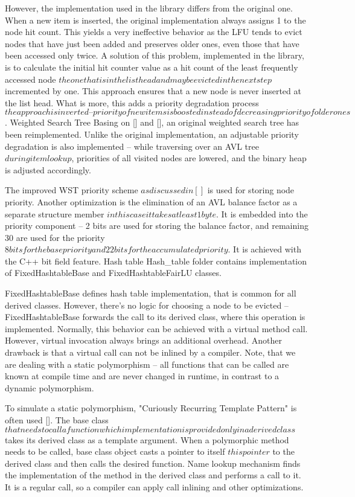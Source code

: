 However, the implementation used in the library differs from the original one. When a new item is inserted, the original implementation always assigns 1 to the node hit count. This yields a very ineffective behavior as the LFU tends to evict nodes that have just been added and preserves older ones, even those that have been accessed only twice. A solution of this problem, implemented in the library, is to calculate the initial hit counter value as a hit count of the least frequently accessed node \(the one that is in the list head and may be evicted in the next step\) incremented by one. This approach ensures that a new node is never inserted at the list head. What is more, this adds a priority degradation process \(the approach is inverted – priority of new items is boosted instead of decreasing priority of older ones\).
Weighted Search Tree
Basing on [] and [], an original weighted search tree has been reimplemented. Unlike the original implementation, an adjustable priority degradation is also implemented – while traversing over an AVL tree \(during item lookup\), priorities of all visited nodes are lowered, and the binary heap is adjusted accordingly.

The improved WST priority scheme \(as discussed in []\) is used for storing node priority. Another optimization is the elimination of an AVL balance factor as a separate structure member \(in this case it takes at least 1 byte\). It is embedded into the priority component – 2 bits are used for storing the balance factor, and remaining 30 are used for the priority \(8 bits for the base priority and 22 bits for the accumulated priority\). It is achieved with the C++ bit field feature.
Hash table
Hash\_table folder contains implementation of FixedHashtableBase and FixedHashtableFairLU classes.

FixedHashtableBase defines hash table implementation, that is common for all derived classes. However, there’s no logic for choosing a node to be evicted – FixedHashtableBase forwards the call to its derived class, where this operation is implemented. Normally, this behavior can be achieved with a virtual method call. However, virtual invocation always brings an additional overhead. Another drawback is that a virtual call can not be inlined by a compiler. Note, that we are dealing with a static polymorphism – all functions that can be called are known at compile time and are never changed in runtime, in contrast to a dynamic polymorphism.

To simulate a static polymorphism, "Curiously Recurring Template Pattern" is often used []. The base class \(that needs to call a function which implementation is provided only in a derived class\) takes its derived class as a template argument. When a polymorphic method needs to be called, base class object casts a pointer to itself \(this pointer\) to the derived class and then calls the desired function. Name lookup mechanism finds the implementation of the method in the derived class and performs a call to it. It is a regular call, so a compiler can apply call inlining and other optimizations.

